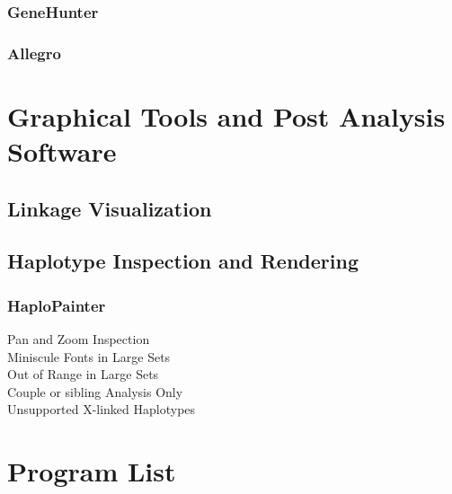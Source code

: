 \subsubsection{GeneHunter}
\subsubsection{Allegro}


\section{Graphical Tools and Post Analysis Software}
\subsection{Linkage Visualization}
\subsection{Haplotype Inspection and Rendering}
\subsubsection{HaploPainter}
\begin{description}
\item[Pan and Zoom Inspection]{}
\item[Miniscule Fonts in Large Sets]{}
\item[Out of Range in Large Sets]{}
\item[Couple or sibling Analysis Only]{}
\item[Unsupported X-linked Haplotypes]{}
\end{description}

\section{Program List}
